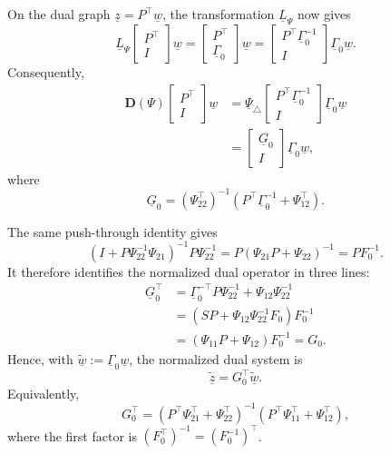 \documentclass[11pt]{article}
\newcommand{\bmat}[1]{\begin{bmatrix}#1\end{bmatrix}}
\begin{document}
On the dual graph $\underline z=P^\top\underline w$, the transformation
$\underline L_\Psi$ now gives
\begin{equation*}
 \underline L_\Psi\bmat{P^\top\\I}\underline w
 =\bmat{P^\top\\\underline\Gamma_0}\underline w
 =\bmat{P^\top\underline\Gamma_0^{-1}\\I}
  \underline\Gamma_0\underline w.
\end{equation*}
Consequently,
\begin{align*}
 \mathbf D(\Psi)\bmat{P^\top\\I}\underline w
 &=\underline\Psi_\triangle
   \bmat{P^\top\underline\Gamma_0^{-1}\\I}
   \underline\Gamma_0\underline w\\
 &=\bmat{\underline G_0\\I}
   \underline\Gamma_0\underline w,
\end{align*}
where
\begin{equation*}
 \underline G_0
 =(\Psi_{22}^\top)^{-1}
  \left(P^\top\underline\Gamma_0^{-1}+\Psi_{12}^\top\right).
\end{equation*}

The same push-through identity gives
\begin{equation*}
 (I+P\Psi_{22}^{-1}\Psi_{21})^{-1}P\Psi_{22}^{-1}
 =P(\Psi_{21}P+\Psi_{22})^{-1}=PF_0^{-1}.
\end{equation*}
It therefore identifies the normalized dual operator in three lines:
\begin{align*}
 \underline G_0^\top
 &=\underline\Gamma_0^{-\top}P\Psi_{22}^{-1}
   +\Psi_{12}\Psi_{22}^{-1}\\
 &=\left(SP
   +\Psi_{12}\Psi_{22}^{-1}F_0\right)F_0^{-1}\\
 &=(\Psi_{11}P+\Psi_{12})F_0^{-1}
 =G_0.
\end{align*}
Hence, with $\tilde{\underline w}:=\underline\Gamma_0\underline w$, the
normalized dual system is
\begin{equation*}
 \tilde{\underline z}=G_0^\top\tilde{\underline w}.
\end{equation*}
Equivalently,
\begin{equation*}
 G_0^\top
 =(P^\top\Psi_{21}^\top+\Psi_{22}^\top)^{-1}
  (P^\top\Psi_{11}^\top+\Psi_{12}^\top),
\end{equation*}
where the first factor is $(F_0^\top)^{-1}=(F_0^{-1})^\top$.
\end{document}

